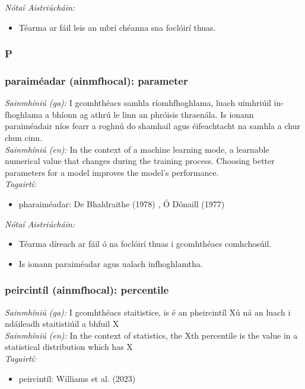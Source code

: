  \noindent \textit{Nótaí Aistriúcháin:}
\begin{itemize}
	\item Téarma ar fáil leis an mbrí chéanna sna foclóirí thuas.
\end{itemize}


 \subsubsection*{P}

\subsubsection*{paraiméadar (ainmfhocal): parameter}
 \noindent \textit{Sainmhíniú (ga):} I gcomhthéacs samhla ríomhfhoghlama, luach uimhriúil in-fhoghlama a bhíonn ag athrú le linn an phróisis thraenála. Is ionann paraiméadair níos fearr a roghnú do shamhail agus éifeachtacht na samhla a chur chun cinn.
\\
 \noindent \textit{Sainmhíniú (en):} In the context of a machine learning mode, a learnable numerical value that changes during the training process. Choosing better parameters for a model improves the model's performance.
\\
 \noindent \textit{Tagairtí:}
\begin{itemize}
	\item pharaiméadar: De Bhaldraithe (1978) \cite{de-bhaldraithe}, Ó Dónaill (1977) \cite{odonaill}
\end{itemize}

 \noindent \textit{Nótaí Aistriúcháin:}
\begin{itemize}
	\item Téarma díreach ar fáil ó na foclóirí thuas i gcomhthéacs comhchosúil.
	\item Is ionann paraiméadar agus ualach infhoghlamtha.
\end{itemize}


\subsubsection*{peircintíl (ainmfhocal): percentile}
 \noindent \textit{Sainmhíniú (ga):} I gcomhthéacs staitistice, is é an pheircintíl Xú ná an luach i ndáileadh staitistiúil a bhfuil X%
\\
 \noindent \textit{Sainmhíniú (en):} In the context of statistics, the Xth percentile is the value in a statistical distribution which has X%
\\
 \noindent \textit{Tagairtí:}
\begin{itemize}
	\item peircintíl: Williams et al. (2023) \cite{storchiste}
\end{itemize}

